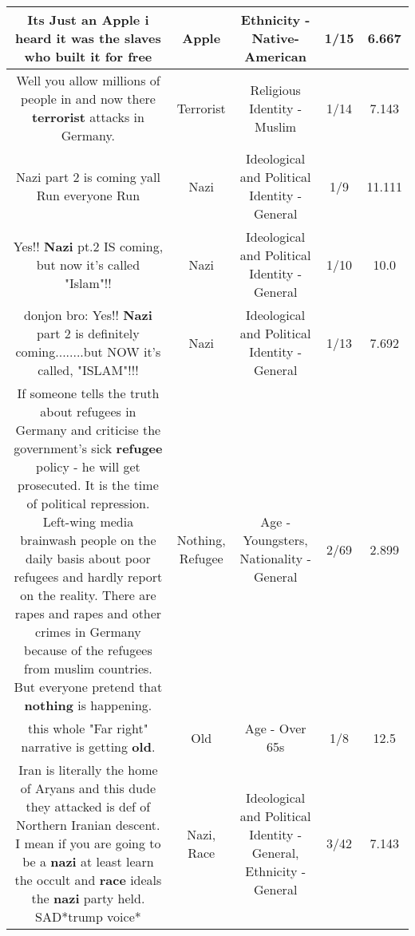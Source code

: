 \documentclass[11pt]{article}
\newlength\mylength
\begin{document}
\begin{center}
\begin{longtable}{|C{.65\mylength}|C{.30\mylength}|C{.12\mylength}|C{.12\mylength}|C{.12\mylength}|}
  \small Its Just an \textbf{Apple} i heard it was the slaves who built it for free\normalsize   & Apple & Ethnicity - Native-American & 1/15 & 6.667 \\  \hline
  \small Well you allow millions of people in and now there \textbf{terrorist} attacks in Germany.\normalsize   & Terrorist & Religious Identity - Muslim & 1/14 & 7.143 \\  \hline
  \small Nazi part 2 is coming yall Run everyone Run\normalsize   & Nazi &  Ideological and Political Identity - General & 1/9 & 11.111 \\  \hline
  \small Yes!! \textbf{Nazi} pt.2 IS coming, but now it's called "Islam"!!\normalsize   & Nazi &  Ideological and Political Identity - General & 1/10 & 10.0 \\  \hline
  \small donjon bro:  Yes!! \textbf{Nazi} part 2 is definitely coming........but NOW it's called, "ISLAM"!!!\normalsize   & Nazi &  Ideological and Political Identity - General & 1/13 & 7.692 \\  \hline
  \small If someone tells the truth about refugees in Germany and criticise the government's sick \textbf{refugee} policy - he will get prosecuted. It is the time of political repression. Left-wing media brainwash people on the daily basis about poor refugees and hardly report on the reality. There are rapes and rapes and other crimes in Germany because of the refugees from muslim countries. But everyone pretend that \textbf{nothing} is happening.\normalsize   & Nothing, Refugee & Age - Youngsters, Nationality - General & 2/69 & 2.899 \\  \hline
  \small this whole "Far right" narrative is getting \textbf{old}.\normalsize   & Old & Age - Over 65s & 1/8 & 12.5 \\  \hline
  \small Iran is literally the home of Aryans and this dude they attacked is def of Northern Iranian descent. I mean if you are going to be a \textbf{nazi} at least learn the occult and \textbf{race} ideals the \textbf{nazi} party held. SAD*trump voice*\normalsize   & Nazi, Race &  Ideological and Political Identity - General, Ethnicity - General & 3/42 & 7.143 \\  \hline

\end{longtable}
\end{center}
\end{document}

